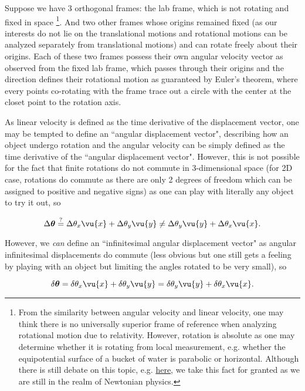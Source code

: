 \documentclass[a4paper,12pt]{report}
\begin{document}
Suppose we have 3 orthogonal frames: the lab frame, which is not rotating and fixed in space \footnote{From the similarity between angular velocity and linear velocity, one may think there is no universally superior frame of reference when analyzing rotational motion due to relativity. However, rotation is absolute as one may determine whether it is rotating from local measurement, e.g. whether the equipotential surface of a bucket of water is parabolic or horizontal. Although there is still debate on this topic, e.g. \href{https://en.wikipedia.org/wiki/Mach\%27s_principle}{here}, we take this fact for granted as we are still in the realm of Newtonian physics.}. And two other frames whose origins remained fixed (as our interests do not lie on the translational motions and rotational motions can be analyzed separately from translational motions) and can rotate freely about their origins. Each of these two frames possess their own angular velocity vector as observed from the fixed lab frame, which passes through their origins and the direction defines their rotational motion as guaranteed by Euler's theorem, where every points co-rotating with the frame trace out a circle with the center at the closet point to the rotation axis.

As linear velocity is defined as the time derivative of the displacement vector, one may be tempted to define an ``angular displacement vector", describing how an object undergo rotation and the angular velocity can be simply defined as the time derivative of the ``angular displacement vector". However, this is not possible for the fact that finite rotations do not commute in 3-dimensional space (for 2D case, rotations do commute as there are only 2 degrees of freedom which can be assigned to positive and negative signs) as one can play with literally any object to try it out, so 

\begin{equation}
	\Delta \boldsymbol{\theta } \stackrel{?}{=} \Delta \theta_{x} \vu{x} + \Delta \theta_{y} \vu{y} \neq \Delta \theta_{y} \vu{y} + \Delta \theta_{x } \vu{x} . 
\end{equation}

However, we \emph{can} define an ``infinitesimal angular displacement vector" as angular infinitesimal displacements do commute (less obvious but one still gets a feeling by playing with an object but limiting the angles rotated to be very small), so 

\begin{equation}
	\delta \boldsymbol{\theta } = \delta \theta _{x} \vu{x} + \delta \theta _{y} \vu{y} = \delta \theta _{y} \vu{y} + \delta \theta _{x} \vu{x}  .
\end{equation}
\end{document}
